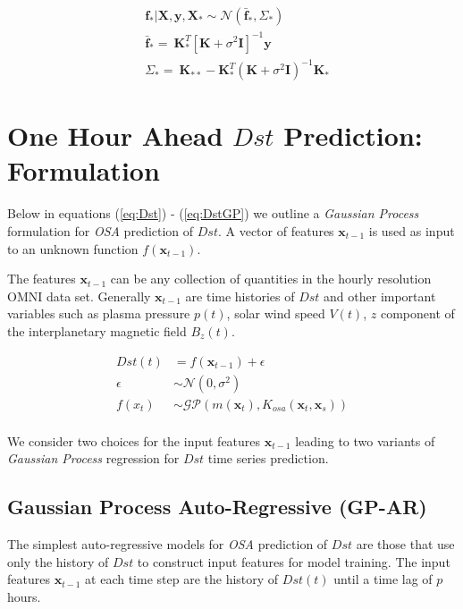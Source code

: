 \documentclass{article}
\begin{document}
\begin{align}
  & \mathbf{f_*}|\mathbf{X},\mathbf{y},\mathbf{X_*} \sim \mathcal{N}(\mathbf{\bar{f}_*}, \Sigma_*)  \label{eq:posterior} \\
  & \mathbf{\bar{f}_*} =  \ \mathbf{K}^T_{*} [\mathbf{K} + \sigma^{2} \mathbf{I}]^{-1} \mathbf{y} \label{eq:posteriormean} \\
  & \Sigma_* = \ \mathbf{K}_{**} - \mathbf{K}^T_{*} \left(\mathbf{K} + \sigma^{2} \mathbf{I}\right)^{-1} \mathbf{K}_{*} \label{eq:posteriorcov}
\end{align}

\section{One Hour Ahead $Dst$ Prediction: Formulation} \label{sec:osa}

Below in equations (\ref{eq:Dst}) - (\ref{eq:DstGP}) we outline a \emph{Gaussian Process} formulation for \emph{OSA} prediction of $Dst$. A vector of features $\mathbf{x}_{t-1}$ is used as input to an unknown function $f(\mathbf{x}_{t-1})$.

The features $\mathbf{x}_{t-1}$ can be any collection of quantities in the hourly resolution OMNI data set. Generally $\mathbf{x}_{t-1}$ are time histories of $Dst$ and other important variables such as plasma pressure $p(t)$, solar wind speed $V(t)$, $z$ component of the interplanetary magnetic field $B_z(t)$.


\begin{align}
  Dst(t) & =  f(\mathbf{x}_{t-1}) + \epsilon \label{eq:Dst} \\
  \epsilon & \sim  \mathcal{N}(0, \sigma^2) \label{eq:GPNoise} \\
  f(x_t) & \sim  \mathcal{GP}(m(\mathbf{x}_t), K_{osa}(\mathbf{x}_t, \mathbf{x}_s)) \label{eq:DstGP} \\
\end{align}

We consider two choices for the input features $\mathbf{x}_{t-1}$ leading to two variants of \emph{Gaussian Process} regression for $Dst$ time series prediction.

\subsection{Gaussian Process Auto-Regressive (GP-AR)} \label{sec:gpar}

The simplest auto-regressive models for \emph{OSA} prediction of $Dst$ are those that use only the history of $Dst$ to construct input features for model training. The input features $\mathbf{x}_{t-1}$ at each time step are the history of $Dst(t)$ until a time lag of $p$ hours.
\end{document}
